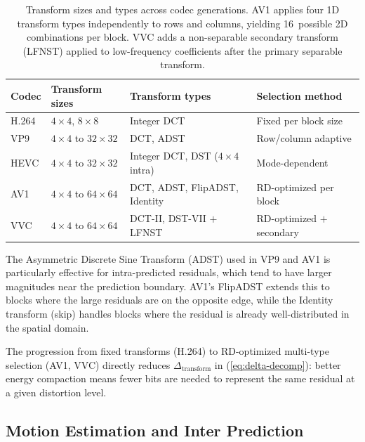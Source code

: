 \begin{table}[ht]
\centering
\small
\renewcommand{\arraystretch}{1.4}
\begin{tabularx}{\textwidth}{lXXX}
\toprule
\textbf{Codec} & \textbf{Transform sizes} & \textbf{Transform types}
  & \textbf{Selection method} \\
\midrule
H.264 &
  $4\!\times\!4$, $8\!\times\!8$ &
  Integer DCT &
  Fixed per block size \\
VP9 &
  $4\!\times\!4$ to $32\!\times\!32$ &
  DCT, ADST &
  Row/column adaptive \\
HEVC &
  $4\!\times\!4$ to $32\!\times\!32$ &
  Integer DCT, DST ($4\!\times\!4$ intra) &
  Mode-dependent \\
AV1 &
  $4\!\times\!4$ to $64\!\times\!64$ &
  DCT, ADST, FlipADST, Identity &
  RD-optimized per block \\
VVC &
  $4\!\times\!4$ to $64\!\times\!64$ &
  DCT-II, DST-VII $+$ LFNST &
  RD-optimized $+$ secondary \\
\bottomrule
\end{tabularx}
\caption{Transform sizes and types across codec generations. AV1 applies
  four 1D transform types independently to rows and columns, yielding
  16~possible 2D combinations per block. VVC adds a non-separable secondary
  transform (LFNST) applied to low-frequency coefficients after the primary
  separable transform.}
\label{tab:transforms}
\end{table}

The Asymmetric Discrete Sine Transform (ADST) used in VP9 and AV1 is
particularly effective for intra-predicted residuals, which tend to have
larger magnitudes near the prediction boundary. AV1's FlipADST extends
this to blocks where the large residuals are on the opposite edge, while
the Identity transform (skip) handles blocks where the residual is already
well-distributed in the spatial domain.

The progression from fixed transforms (H.264) to RD-optimized multi-type
selection (AV1, VVC) directly reduces $\Delta_{\text{transform}}$ in
(\ref{eq:delta-decomp}): better energy compaction means fewer bits are
needed to represent the same residual at a given distortion level.

\subsection{Motion Estimation and Inter Prediction}
\label{sec:motion}

